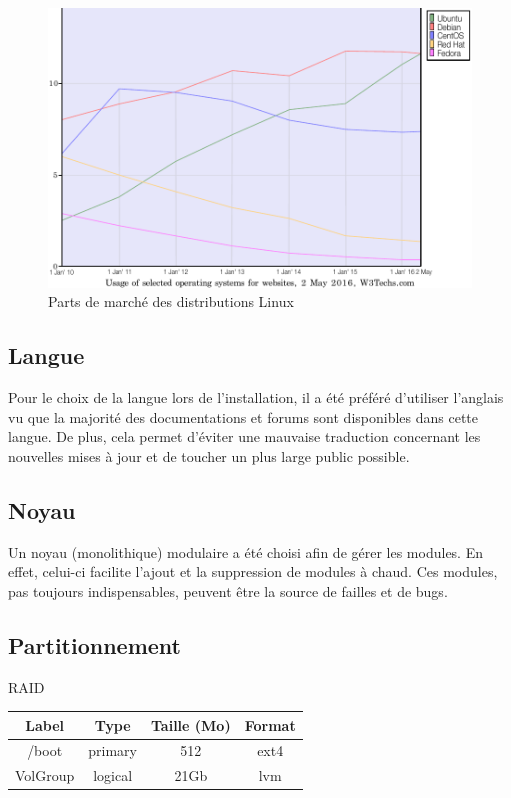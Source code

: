 \begin{figure}[h]
  \centering
  \includegraphics[scale=0.65]
  {textures/images/installation/distributions.pdf}
  \caption{Parts de marché des distributions Linux}
\end{figure}

\newpage

\subsection{Langue}
\label{sec:langue}

Pour le choix de la langue lors de l'installation, il a été préféré d'utiliser
l'anglais vu que la majorité des documentations et forums sont disponibles dans
cette langue. De plus, cela permet d'éviter une mauvaise traduction concernant
les nouvelles mises à jour et de toucher un plus large public possible.

\subsection{Noyau}
\label{sec:noyau}

Un noyau (monolithique) modulaire a été choisi afin de gérer les
modules. En effet, celui-ci facilite l'ajout et la suppression de modules à
chaud. Ces modules, pas toujours indispensables, peuvent être la source de
failles et de bugs.

\subsection{Partitionnement}
\label{sec:partitionnement}

RAID

\begin{center}
  \begin{tabularx}{\linewidth}{|C|C|C|C|}
    \hline
    Label & Type & Taille (Mo) & Format \\
    \hline
    \hline
    /boot & primary & 512 & ext4 \\
    \hline
    VolGroup & logical & 21Gb & lvm \\
    \hline
  \end{tabularx}
\end{center}

